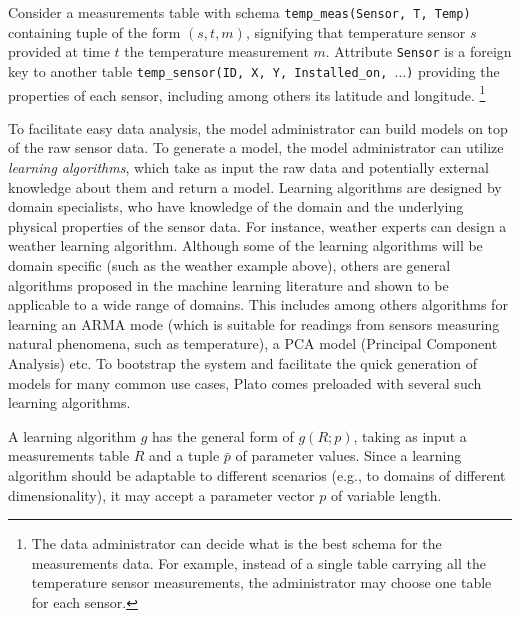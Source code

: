 \vspace*{0.5cm}
\begin{example}
Consider a measurements table with schema \texttt{temp\_meas(Sensor, T, Temp)} containing tuple of the form $(s, t, m)$, signifying that temperature sensor $s$ provided at time $t$ the temperature measurement $m$.
Attribute \texttt{Sensor} is a foreign key to another table \texttt{temp\_sensor(ID, X, Y, Installed\_on, $\ldots$)} providing the properties of each sensor, including among others its latitude and longitude.%
\footnote{The data administrator can decide what is the best schema for the measurements data. For example, instead of a single table carrying all the temperature sensor measurements, the administrator may choose one table for each sensor.
}
\end{example}
\vspace*{0.5cm}

To facilitate easy data analysis, the model administrator can build models on top of the raw sensor data. To generate a model, the model administrator can utilize {\em learning algorithms}, which take as input the raw data and potentially external knowledge about them and return a model. Learning algorithms are designed by domain specialists, who have knowledge of the domain and the underlying physical properties of the sensor data. For instance, weather experts can design a weather learning algorithm. Although some of the learning algorithms will be domain specific (such as the weather example above), others are general algorithms proposed in the machine learning literature  and shown to be applicable to a wide range of domains. This includes among others algorithms for learning an ARMA mode (which is suitable for readings from sensors measuring natural phenomena, such as temperature), a PCA model (Principal Component Analysis) etc. To bootstrap the system and facilitate the quick generation of models for many common use cases, Plato comes preloaded with several such learning algorithms.

A learning algorithm $g$ has the general form of $g(R;p)$, taking as input a measurements table $R$ and a tuple $\bar{p}$ of parameter values. Since a learning algorithm should be adaptable to different scenarios (e.g., to domains of different dimensionality), it may accept a parameter vector $p$ of variable length.

